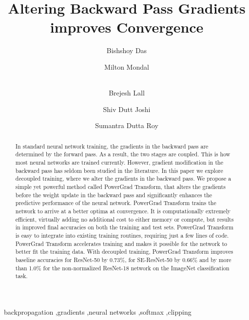 \documentclass[times,sort&compress]{elsarticle}
\begin{document}
\clearpage


\ifpreprint
  \setcounter{page}{1}
\else
  \setcounter{page}{1}
\fi

\begin{frontmatter}

\title{Altering Backward Pass Gradients improves Convergence}

\author[1]{Bishshoy Das}

\author[1]{Milton Mondal}

\author[1]{\\ Brejesh Lall}

\author[1]{Shiv Dutt Joshi}

\author[1]{Sumantra Dutta Roy}


\address[1]{Electrical Engineering Department, Indian Institute of Technology Delhi, Hauz Khas, New Delhi - 110016, India}



\begin{abstract}
In standard neural network training, the gradients in the backward pass are determined
by the forward pass. As a result, the two stages are coupled. This is how most neural
networks are trained currently. However, gradient modification in the backward pass has
seldom been studied in the literature. In this paper we explore decoupled training,
where we alter the gradients in the backward pass. We propose a simple yet powerful
method called PowerGrad Transform, that alters the gradients before the weight update in
the backward pass and significantly enhances the predictive performance of the neural
network. PowerGrad Transform trains the network to arrive at a better optima at
convergence. It is computationally extremely efficient, virtually adding no additional
cost to either memory or compute, but results in improved final accuracies on both the
training and test sets. PowerGrad Transform is easy to integrate into existing training
routines, requiring just a few lines of code. PowerGrad Transform accelerates training
and makes it possible for the network to better fit the training data. With decoupled
training, PowerGrad Transform improves baseline accuracies for ResNet-50 by 0.73\%, for
SE-ResNet-50 by 0.66\% and by more than 1.0\% for the non-normalized ResNet-18 network
on the ImageNet classification task.
\end{abstract}

\begin{keyword}
\KWD backpropagation \sep gradients \sep neural networks \sep softmax \sep clipping
\end{keyword}

\end{frontmatter}
\end{document}
